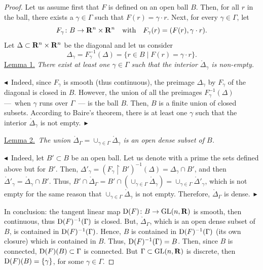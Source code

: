 \begin{proof}
  Let us assume first that $F$ is defined on an open ball $B$.
  Then,
  for all $r$ in the ball,
  there exists a $\gamma \in \Gamma$ such that $F(r) = \gamma\cdot r$.
  Next,
  for every $\gamma \in \Gamma$, let
  $$
    F_\gamma \colon B \to \mathbf{R}^n \times \mathbf{R}^n \quad \mbox{with} \quad F_\gamma(r) = (F(r), \gamma\cdot r).
  $$
  Let $\Delta \subset \mathbf{R}^n \times \mathbf{R}^n$ be the diagonal and let us consider
  $$
    \Delta_\gamma = F_\gamma^{-1}(\Delta) = \{ r \in B \mid F(r) = \gamma\cdot r \}.
  $$
  \uline{Lemma 1.} {\itshape There exist at least one $\gamma \in \Gamma$ such that the interior $\mathring{\Delta}_\gamma$ is non-empty.}

  $\blacktriangleleft$~Indeed,
  since $F_\gamma$ is smooth (thus continuous),
  the preimage $\Delta_\gamma$ by $F_\gamma$ of the diagonal is closed in $B$.
  However,
  the union of all the preimages $F_\gamma^{-1}(\Delta)$
  ---~when $\gamma$ runs over $\Gamma$~---
  is the ball $B$.
  Then,
  $B$ is a finite union of closed subsets.
  According to Baire's theorem,
  there is at least one $\gamma$ such that the interior $\mathring{\Delta}_\gamma$ is not empty.~$\blacktriangleright$

  \uline{Lemma 2.}~{\itshape The union $\mathring{\Delta}_\Gamma = \cup_{\gamma \in \Gamma} \mathring{\Delta}_\gamma$ is an open dense subset of $B$.}

  $\blacktriangleleft$~Indeed,
  let $B' \subset B$ be an open ball.
  Let us denote with a prime the sets defined above but for $B'$.
  Then,
  $\Delta'_\gamma = (F_\gamma  \restriction B' )^{-1}(\Delta) = \Delta_\gamma \cap B'$,
  and then $\mathring{\Delta}'_\gamma = \mathring{\Delta}_\gamma \cap B'$.
  Thus,
  $B' \cap \mathring{\Delta}_\Gamma  = B' \cap (\cup_{\gamma \in \Gamma} \mathring{\Delta}_\gamma) = \cup_{\gamma \in \Gamma} \mathring{\Delta}'_\gamma$,
  which is not empty for the same reason that $\cup_{\gamma \in \Gamma} \mathring{\Delta}_\gamma$ is not empty.
  Therefore,
  $\mathring{\Delta}_\Gamma$ is dense.~$\blacktriangleright$

  In conclusion:
  the tangent linear map $\operatorname{D}(F) \colon B \to \mathrm{GL}(n,\mathbf{R})$ is smooth,
  then continuous,
  thus $\operatorname{D}(F)^{-1}(\Gamma)$ is closed.
  But,
  $\mathring{\Delta}_\Gamma$,
  which is an open dense subset of $B$,
  is contained in $\operatorname{D}(F)^{-1}(\Gamma)$.
  Hence,
  $B$ is contained in $\operatorname{D}(F)^{-1}(\Gamma)$ (its own closure) which is contained in $B$.
  Thus,
  $\operatorname{D}(F)^{-1}(\Gamma) = B$.
  Then,
  since $B$ is connected, $\operatorname{D}(F)(B) \subset \Gamma$ is connected.
  But $\Gamma \subset \mathrm{GL}(n,\mathbf{R})$ is discrete,
  then $\operatorname{D}(F)(B) = \{ \gamma \}$,
  for some $\gamma \in \Gamma$.
\end{proof}


